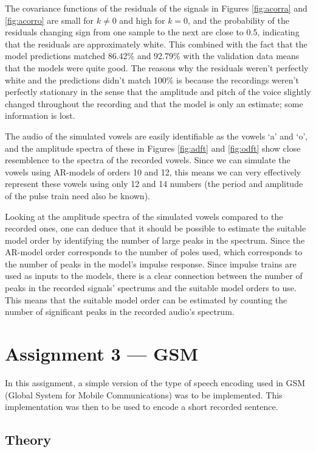 \documentclass{IEEEtran}
\begin{document}
The covariance functions of the residuals of the signals in Figures
\ref{fig:acorra} and \ref{fig:acorro} are small for $k \neq 0$ and
high for $k=0$, and the probability of the residuals changing sign from
one sample to the next are close to 0.5, indicating that the residuals are
approximately white. This combined with the fact that the model predictions
matched 86.42\% and 92.79\% with the validation data means that the models
were quite good. The reasons why the residuals weren't perfectly white and
the predictions didn't match 100\% is because the recordings weren't perfectly
stationary in the sense that the amplitude and pitch of the voice slightly
changed throughout the recording and that the model is only an estimate; some
information is lost.

The audio of the simulated vowels are easily identifiable as the vowels
`a' and `o', and the amplitude spectra of these in Figures \ref{fig:adft} and
\ref{fig:odft} show close resemblence to the spectra of the recorded vowels.
Since we can simulate the vowels using AR-models of orders 10 and 12, this
means we can very effectively represent these vowels using only 12 and 14
numbers (the period and amplitude of the pulse train need also be known).

Looking at the amplitude spectra of the simulated vowels compared to the
recorded ones, one can deduce that it should be possible to estimate the
suitable model order by identifying the number of large peaks in the
spectrum. Since the AR-model order corresponds to the number of poles used,
which corresponds to the number of peaks in the model's impulse response. Since
impulse trains are used as inputs to the models, there is a clear connection
between the number of peaks in the recorded signals' spectrums and the
suitable model orders to use. This means that the suitable model order
can be estimated by counting the number of significant peaks in the
recorded audio's spectrum.

\section{Assignment 3 --- GSM}

In this assignment, a simple version of the type of speech encoding used in GSM
(Global System for Mobile Communications) was to be implemented. This
implementation was then to be used to encode a short recorded sentence.

\subsection{Theory}
\label{sub:vimtheory}
\end{document}
